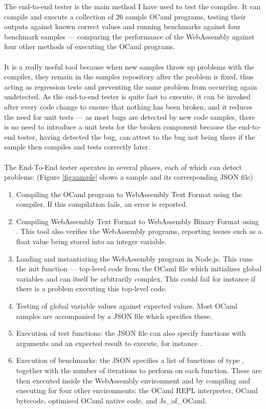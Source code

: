 The end-to-end tester is the main method I have used to test the compiler. It can compile and execute a collection of 26 sample OCaml programs, testing their outputs against known correct values and running benchmarks against four benchmark samples --- comparing the performance of the WebAssembly against four other methods of executing the OCaml programs.
\\\\
It is a really useful tool because when new samples throw up problems with the compiler, they remain in the samples repository after the problem is fixed, thus acting as regression tests and preventing the same problem from occurring again undetected. As the end-to-end tester is quite fast to execute, it can be invoked after every code change to ensure that nothing has been broken, and it reduces the need for unit tests --- as most bugs are detected by new code samples, there is no need to introduce a unit tests for the broken component because the end-to-end tester, having detected the bug, can attest to the bug not being there if the sample then compiles and tests correctly later.
\\\\
The End-To-End tester operates in several phases, each of which can detect problems: (Figure \ref{fig:sample} shows a sample and its corresponding JSON file)
\begin{enumerate}
	\item Compiling the OCaml program to WebAssembly Text Format using the compiler. If this compilation fails, an error is reported.
	\item Compiling WebAssembly Text Format to WebAssembly Binary Format using . This tool also verifies the WebAssembly programs, reporting issues such as a float value being stored into an integer variable.
	\item Loading and instantiating the WebAssembly program in Node.js. This runs the init function --- top-level code from the OCaml file which initializes global variables and can itself be arbitrarily complex. This could fail for instance if there is a problem executing this top-level code.
	\item Testing of global variable values against expected values. Most OCaml samples are accompanied by a JSON file which specifies these.
	\item Execution of test functions: the JSON file can also specify functions with arguments and an expected result to execute, for instance .
	\item Execution of benchmarks: the JSON specifies a list of functions of type , together with the number of iterations to perform on each function. These are then executed inside the WebAssembly environment and by compiling and executing for four other environments: the OCaml REPL interpreter, OCaml bytecode, optimised OCaml native code, and Js\_of\_OCaml.
\end{enumerate}
